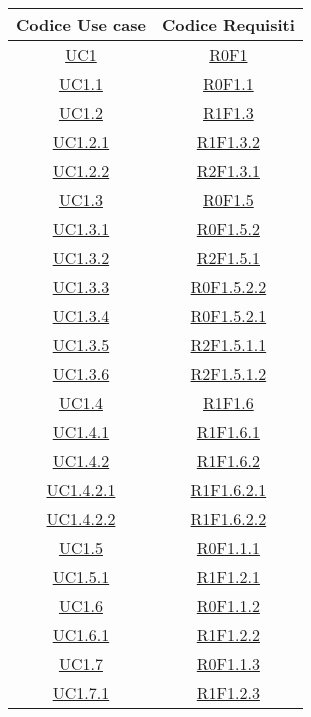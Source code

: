 \begin{longtable}{|c|c|}
\hline
\textbf{Codice Use case} & \textbf{Codice Requisiti} \\
\hline
\endhead
\hyperlink{UC1}{UC1} & \hyperlink{R0F1}{R0F1}\\
\hline
\hyperlink{UC1.1}{UC1.1} & \hyperlink{R0F1.1}{R0F1.1}\\
\hline
\hyperlink{UC1.2}{UC1.2} & \hyperlink{R1F1.3}{R1F1.3}\\
\hline
\hyperlink{UC1.2.1}{UC1.2.1} & \hyperlink{R1F1.3.2}{R1F1.3.2}\\
\hline
\hyperlink{UC1.2.2}{UC1.2.2} & \hyperlink{R2F1.3.1}{R2F1.3.1}\\
\hline
\hyperlink{UC1.3}{UC1.3} & \hyperlink{R0F1.5}{R0F1.5}\\
\hline
\hyperlink{UC1.3.1}{UC1.3.1} & \hyperlink{R0F1.5.2}{R0F1.5.2}\\
\hline
\hyperlink{UC1.3.2}{UC1.3.2} & \hyperlink{R2F1.5.1}{R2F1.5.1}\\
\hline
\hyperlink{UC1.3.3}{UC1.3.3} & \hyperlink{R0F1.5.2.2}{R0F1.5.2.2}\\
\hline
\hyperlink{UC1.3.4}{UC1.3.4} & \hyperlink{R0F1.5.2.1}{R0F1.5.2.1}\\
\hline
\hyperlink{UC1.3.5}{UC1.3.5} & \hyperlink{R2F1.5.1.1}{R2F1.5.1.1}\\
\hline
\hyperlink{UC1.3.6}{UC1.3.6} & \hyperlink{R2F1.5.1.2}{R2F1.5.1.2}\\
\hline
\hyperlink{UC1.4}{UC1.4} & \hyperlink{R1F1.6}{R1F1.6}\\
\hline
\hyperlink{UC1.4.1}{UC1.4.1} & \hyperlink{R1F1.6.1}{R1F1.6.1}\\
\hline
\hyperlink{UC1.4.2}{UC1.4.2} & \hyperlink{R1F1.6.2}{R1F1.6.2}\\
\hline
\hyperlink{UC1.4.2.1}{UC1.4.2.1} & \hyperlink{R1F1.6.2.1}{R1F1.6.2.1}\\
\hline
\hyperlink{UC1.4.2.2}{UC1.4.2.2} & \hyperlink{R1F1.6.2.2}{R1F1.6.2.2}\\
\hline
\hyperlink{UC1.5}{UC1.5} & \hyperlink{R0F1.1.1}{R0F1.1.1}\\
\hline
\hyperlink{UC1.5.1}{UC1.5.1} & \hyperlink{R1F1.2.1}{R1F1.2.1}\\
\hline
\hyperlink{UC1.6}{UC1.6} & \hyperlink{R0F1.1.2}{R0F1.1.2}\\
\hline
\hyperlink{UC1.6.1}{UC1.6.1} & \hyperlink{R1F1.2.2}{R1F1.2.2}\\
\hline
\hyperlink{UC1.7}{UC1.7} & \hyperlink{R0F1.1.3}{R0F1.1.3}\\
\hline
\hyperlink{UC1.7.1}{UC1.7.1} & \hyperlink{R1F1.2.3}{R1F1.2.3}\\

\end{longtable}
